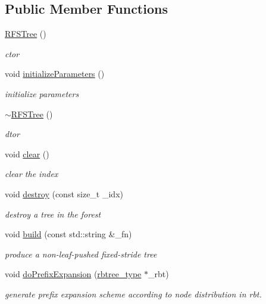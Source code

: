 \subsection*{Public Member Functions}
\begin{DoxyCompactItemize}
\item 
\hyperlink{classRFSTree_aaf28d84e3bce9401a3b64d6a58119a7c}{R\-F\-S\-Tree} ()
\begin{DoxyCompactList}\small\item\em ctor \end{DoxyCompactList}\item 
void \hyperlink{classRFSTree_af94bdbba63871991f0cf9c18d140f4ce}{initialize\-Parameters} ()
\begin{DoxyCompactList}\small\item\em initialize parameters \end{DoxyCompactList}\item 
\hyperlink{classRFSTree_acb2bd2d6342c24f41b08e6ed76aab02d}{$\sim$\-R\-F\-S\-Tree} ()
\begin{DoxyCompactList}\small\item\em dtor \end{DoxyCompactList}\item 
void \hyperlink{classRFSTree_ab7fe9e3717784a9458048756ca4c8196}{clear} ()
\begin{DoxyCompactList}\small\item\em clear the index \end{DoxyCompactList}\item 
void \hyperlink{classRFSTree_ae807d6ad404f6d7fb556223523113f3e}{destroy} (const size\-\_\-t \-\_\-idx)
\begin{DoxyCompactList}\small\item\em destroy a tree in the forest \end{DoxyCompactList}\item 
void \hyperlink{classRFSTree_af46370043a6df10557b4b5ea45c1f543}{build} (const std\-::string \&\-\_\-fn)
\begin{DoxyCompactList}\small\item\em produce a non-\/leaf-\/pushed fixed-\/stride tree \end{DoxyCompactList}\item 
void \hyperlink{classRFSTree_ad6ed56a7214f892f1432b1c183506780}{do\-Prefix\-Expansion} (\hyperlink{classRFSTree_a883be6d647fcf136a9e6903985387134}{rbtree\-\_\-type} $\ast$\-\_\-rbt)
\begin{DoxyCompactList}\small\item\em generate prefix expansion scheme according to node distribution in rbt. \end{DoxyCompactList}\item 

\end{DoxyCompactItemize}
